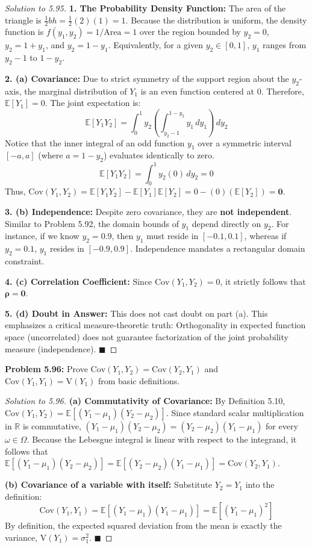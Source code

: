 \documentclass[11pt, a4paper]{article}
\theoremstyle{definition}
\theoremstyle{remark}
\newcommand{\R}{\mathbb{R}}
\newcommand{\E}{\mathbb{E}}
\newcommand{\Cov}{\mathrm{Cov}}
\newcommand{\Var}{\mathrm{V}}
\begin{document}
\begin{proof}[Solution to 5.95]
\textbf{1. The Probability Density Function:}
The area of the triangle is $\frac{1}{2}bh = \frac{1}{2}(2)(1) = 1$. Because the distribution is uniform, the density function is $f(y_1, y_2) = 1/\text{Area} = 1$ over the region bounded by $y_2=0$, $y_2 = 1 + y_1$, and $y_2 = 1 - y_1$.
Equivalently, for a given $y_2 \in [0, 1]$, $y_1$ ranges from $y_2 - 1$ to $1 - y_2$.

\textbf{2. (a) Covariance:}
Due to strict symmetry of the support region about the $y_2$-axis, the marginal distribution of $Y_1$ is an even function centered at 0. Therefore, $\E[Y_1] = 0$.
The joint expectation is:
\[
\E[Y_1 Y_2] = \int_{0}^{1} y_2 \left( \int_{y_2 - 1}^{1 - y_2} y_1 \,dy_1 \right) \,dy_2
\]
Notice that the inner integral of an odd function $y_1$ over a symmetric interval $[-a, a]$ (where $a = 1-y_2$) evaluates identically to zero.
\[
\E[Y_1 Y_2] = \int_{0}^{1} y_2 (0) \,dy_2 = 0
\]
Thus, $\Cov(Y_1, Y_2) = \E[Y_1 Y_2] - \E[Y_1]\E[Y_2] = 0 - (0)(\E[Y_2]) = \mathbf{0}$.

\textbf{3. (b) Independence:}
Despite zero covariance, they are \textbf{not independent}. Similar to Problem 5.92, the domain bounds of $y_1$ depend directly on $y_2$. For instance, if we know $y_2 = 0.9$, then $y_1$ must reside in $[-0.1, 0.1]$, whereas if $y_2 = 0.1$, $y_1$ resides in $[-0.9, 0.9]$. Independence mandates a rectangular domain constraint.

\textbf{4. (c) Correlation Coefficient:}
Since $\Cov(Y_1, Y_2) = 0$, it strictly follows that $\mathbf{\rho = 0}$.

\textbf{5. (d) Doubt in Answer:}
This does not cast doubt on part (a). This emphasizes a critical measure-theoretic truth: Orthogonality in expected function space (uncorrelated) does not guarantee factorization of the joint probability measure (independence). $\blacksquare$
\end{proof}

\vspace{1em}
\noindent\textbf{Problem 5.96:} Prove $\Cov(Y_1, Y_2) = \Cov(Y_2, Y_1)$ and $\Cov(Y_1, Y_1) = \Var(Y_1)$ from basic definitions.

\begin{proof}[Solution to 5.96]
\textbf{(a) Commutativity of Covariance:}
By Definition 5.10, $\Cov(Y_1, Y_2) = \E[(Y_1 - \mu_1)(Y_2 - \mu_2)]$. Since standard scalar multiplication in $\R$ is commutative, $(Y_1 - \mu_1)(Y_2 - \mu_2) = (Y_2 - \mu_2)(Y_1 - \mu_1)$ for every $\omega \in \Omega$. Because the Lebesgue integral is linear with respect to the integrand, it follows that $\E[(Y_1 - \mu_1)(Y_2 - \mu_2)] = \E[(Y_2 - \mu_2)(Y_1 - \mu_1)] = \Cov(Y_2, Y_1)$.

\textbf{(b) Covariance of a variable with itself:}
Substitute $Y_2 = Y_1$ into the definition:
\[
\Cov(Y_1, Y_1) = \E[(Y_1 - \mu_1)(Y_1 - \mu_1)] = \E[(Y_1 - \mu_1)^2]
\]
By definition, the expected squared deviation from the mean is exactly the variance, $\Var(Y_1) = \sigma_1^2$. $\blacksquare$
\end{proof}
\end{document}
